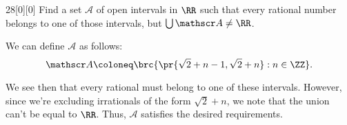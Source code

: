 \documentclass{article}
\begin{document}
\begin{hw}{28}[0][0]
	Find a set $\mathscr A$ of open intervals in $\RR$ such that every rational number belongs to one of those intervals, but $\bigcup \mathscr A \neq \RR$.
\end{hw}
\begin{solution}
	We can define $\mathscr A$ as follows:
	\begin{equation*}
		\mathscr A \coloneq \brc{\pr{\sqrt 2 + n - 1, \sqrt 2 + n} : n \in \ZZ}.
	\end{equation*}

	We see then that every rational must belong to one of these intervals. However, since we're excluding irrationals of the form $\sqrt 2 + n$, we note that the union can't be equal to $\RR$. Thus, $\mathscr A$ satisfies the desired requirements.
\end{solution}
\end{document}
